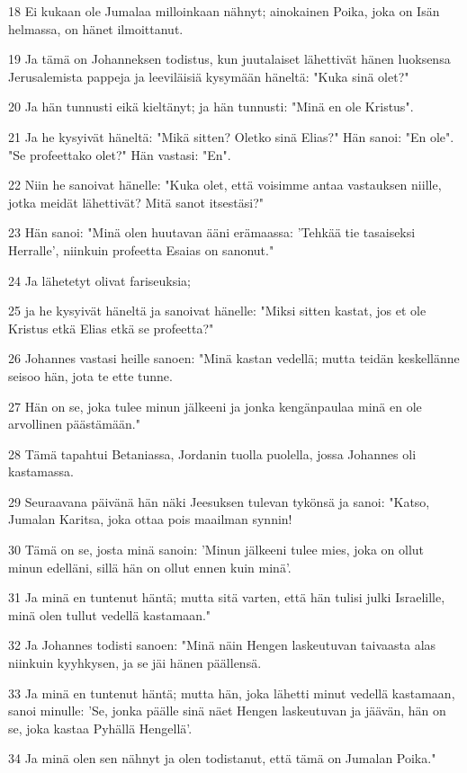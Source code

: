 \par 18 Ei kukaan ole Jumalaa milloinkaan nähnyt; ainokainen Poika, joka on Isän helmassa, on hänet ilmoittanut.
\par 19 Ja tämä on Johanneksen todistus, kun juutalaiset lähettivät hänen luoksensa Jerusalemista pappeja ja leeviläisiä kysymään häneltä: "Kuka sinä olet?"
\par 20 Ja hän tunnusti eikä kieltänyt; ja hän tunnusti: "Minä en ole Kristus".
\par 21 Ja he kysyivät häneltä: "Mikä sitten? Oletko sinä Elias?" Hän sanoi: "En ole". "Se profeettako olet?" Hän vastasi: "En".
\par 22 Niin he sanoivat hänelle: "Kuka olet, että voisimme antaa vastauksen niille, jotka meidät lähettivät? Mitä sanot itsestäsi?"
\par 23 Hän sanoi: "Minä olen huutavan ääni erämaassa: 'Tehkää tie tasaiseksi Herralle', niinkuin profeetta Esaias on sanonut."
\par 24 Ja lähetetyt olivat fariseuksia;
\par 25 ja he kysyivät häneltä ja sanoivat hänelle: "Miksi sitten kastat, jos et ole Kristus etkä Elias etkä se profeetta?"
\par 26 Johannes vastasi heille sanoen: "Minä kastan vedellä; mutta teidän keskellänne seisoo hän, jota te ette tunne.
\par 27 Hän on se, joka tulee minun jälkeeni ja jonka kengänpaulaa minä en ole arvollinen päästämään."
\par 28 Tämä tapahtui Betaniassa, Jordanin tuolla puolella, jossa Johannes oli kastamassa.
\par 29 Seuraavana päivänä hän näki Jeesuksen tulevan tykönsä ja sanoi: "Katso, Jumalan Karitsa, joka ottaa pois maailman synnin!
\par 30 Tämä on se, josta minä sanoin: 'Minun jälkeeni tulee mies, joka on ollut minun edelläni, sillä hän on ollut ennen kuin minä'.
\par 31 Ja minä en tuntenut häntä; mutta sitä varten, että hän tulisi julki Israelille, minä olen tullut vedellä kastamaan."
\par 32 Ja Johannes todisti sanoen: "Minä näin Hengen laskeutuvan taivaasta alas niinkuin kyyhkysen, ja se jäi hänen päällensä.
\par 33 Ja minä en tuntenut häntä; mutta hän, joka lähetti minut vedellä kastamaan, sanoi minulle: 'Se, jonka päälle sinä näet Hengen laskeutuvan ja jäävän, hän on se, joka kastaa Pyhällä Hengellä'.
\par 34 Ja minä olen sen nähnyt ja olen todistanut, että tämä on Jumalan Poika."
